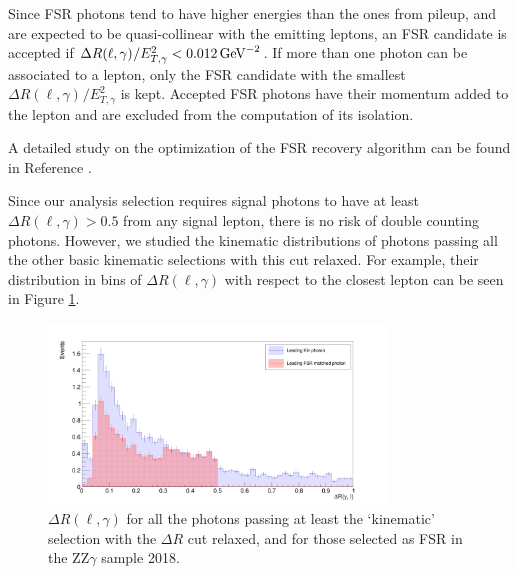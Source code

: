 Since FSR photons tend to have higher energies than the ones from pileup, and are expected to be quasi-collinear with the emitting leptons, an FSR candidate is accepted if $\Delta R(\ell, \gamma)^{} / E_{T,\gamma}^{2} < 0.012 \,\text{Ge\hspace{-.08em}V}^{-2}$.
If more than one photon can be associated to a lepton, only the FSR candidate with the smallest $\Delta R(\ell, \gamma)^{} / E_{T,\gamma}^{2}$ is kept.
Accepted FSR photons have their momentum added to the lepton and are excluded from the computation of its isolation.

A detailed study on the optimization of the FSR recovery algorithm can be found in Reference \cite{Sirunyan2017}.

Since our analysis selection requires signal photons to have at least $\Delta R(\ell, \gamma) > 0.5$ from any signal lepton, there is no risk of double counting photons.
However, we studied the kinematic distributions of photons passing all the other basic kinematic selections with this cut relaxed.
For example, their distribution in bins of $\Delta R(\ell, \gamma)$ with respect to the closest lepton
can be seen in Figure \ref{fig:dRl_fsr_photons}.
\begin{figure}[ht]
\begin{center}
        \includegraphics[width=0.8\textwidth]{Figures/lead_dRl_kin_vs_fsrMatched_rebinned.png}
\end{center}
\caption{$\Delta R(\ell, \gamma)$ for all the photons passing at least the `kinematic' selection with the $\Delta R$ cut relaxed, and for those selected as FSR in the ZZ$\gamma$ sample 2018.}
\label{fig:dRl_fsr_photons}
\end{figure}
